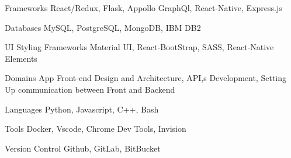 

\begin{cvskills}

  \cvskill
    {Frameworks} %
    {React/Redux, Flask, Appollo GraphQl, React‑Native, Express.js} %

  \cvskill
    {Databases} %
    {MySQL, PostgreSQL, MongoDB, IBM DB2} %

  \cvskill
    {UI Styling Frameworks} %
    {Material UI, React‑BootStrap, SASS, React‑Native Elements} %

  \cvskill
    {Domains} %
    {App Front‑end Design and Architecture, API,s Development, Setting Up communication between Front and Backend} %

  \cvskill
    {Languages} %
    {Python, Javascript, C++, Bash} %

  \cvskill
    {Tools} %
    {Docker, Vscode, Chrome Dev Tools, Invision} %

  \cvskill
    {Version Control} %
    {Github, GitLab, BitBucket} %

\end{cvskills}
